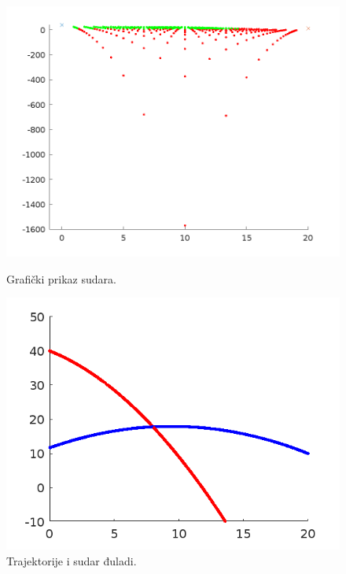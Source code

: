 \documentclass{article}
\begin{document}
\begin{figure}[h]
  \centering
  \begin{minipage}[b]{0.45\linewidth}
    \centering
    \includegraphics[width=\linewidth]{slika4_omm.png}
    \caption{Grafički prikaz sudara.}
    \label{fig:image5}
  \end{minipage}
  \hspace{0.5cm}
  \begin{minipage}[b]{0.45\linewidth}
    \centering
    \includegraphics[width=\linewidth]{sudar.png}
    \caption{Trajektorije i sudar đuladi.}
    \label{fig:image6}
  \end{minipage}
  \label{fig:my_images2}
\end{figure}
\newpage
\end{document}
